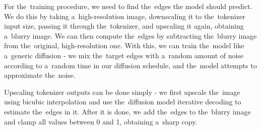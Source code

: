 For the~training procedure, we need to find the~edges the model should predict. We do this by taking a~high-resolution image, downscaling it to the~tokenizer input size, passing it through the~tokenizer, and upscaling it again, obtaining a~blurry image. We can then compute the~edges by subtracting the~blurry image from the~original, high-resolution one. With this, we can train the~model like a~generic diffusion - we mix the~target edges with a~random amount of noise according to a~random time in our diffusion schedule, and the~model attempts to approximate the~noise.

Upscaling tokenizer outputs can be done simply - we first upscale the~image using bicubic interpolation and use the~diffusion model iterative decoding to estimate the~edges in it. After it is done, we add the~edges to the~blurry image and clamp all values between 0 and 1, obtaining a~sharp copy.
